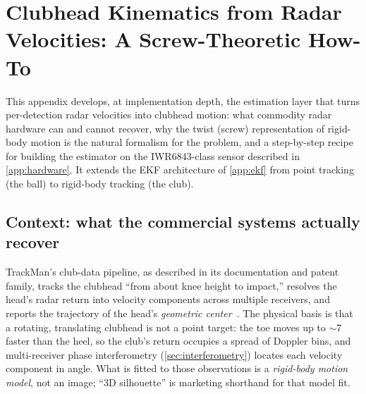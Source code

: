 \chapter{Clubhead Kinematics from Radar Velocities: A Screw-Theoretic How-To}
\label{app:screw}

This appendix develops, at implementation depth, the estimation layer that turns per-detection radar velocities into clubhead motion: what commodity radar hardware can and cannot recover, why the twist (screw) representation of rigid-body motion is the natural formalism for the problem, and a step-by-step recipe for building the estimator on the IWR6843-class sensor described in \cref{app:hardware}.
It extends the EKF architecture of \cref{app:ekf} from point tracking (the ball) to rigid-body tracking (the club).

\section{Context: what the commercial systems actually recover}
\label{sec:screw-context}

TrackMan's club-data pipeline, as described in its documentation and patent family, tracks the clubhead ``from about knee height to impact,'' resolves the head's radar return into velocity components across multiple receivers, and reports the trajectory of the head's \emph{geometric center}~\cite{trackmanclubspeed,us10850179,trackmanoert}.
The physical basis is that a rotating, translating clubhead is not a point target: the toe moves up to $\sim$7\mph{} faster than the heel, so the club's return occupies a spread of Doppler bins, and multi-receiver phase interferometry (\cref{sec:interferometry}) locates each velocity component in angle.
What is fitted to those observations is a \emph{rigid-body motion model}, not an image; ``3D silhouette'' is marketing shorthand for that model fit.

